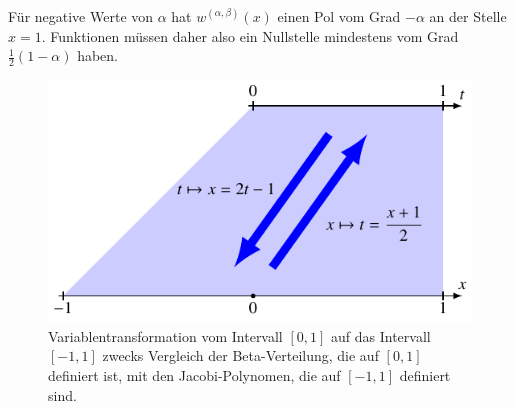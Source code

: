Für negative Werte von $\alpha$ hat $w^{(\alpha,\beta)}(x)$ einen
Pol vom Grad $-\alpha$ an der Stelle $x=1$.
Funktionen müssen daher also ein Nullstelle mindestens vom Grad
$\frac12(1-\alpha)$ haben.

\begin{figure}
\centering
\includegraphics{chapters/070-orthogonalitaet/images/lintrans.pdf}
\caption{Variablentransformation vom Intervall $[0,1]$ auf das
Intervall $[-1,1]$ zwecks Vergleich der Beta-Verteilung, die auf $[0,1]$
definiert ist, mit den Jacobi-Polynomen, die auf $[-1,1]$ definiert
sind.
\label{buch:orthogonal:fig:lintrans}}
\end{figure}
